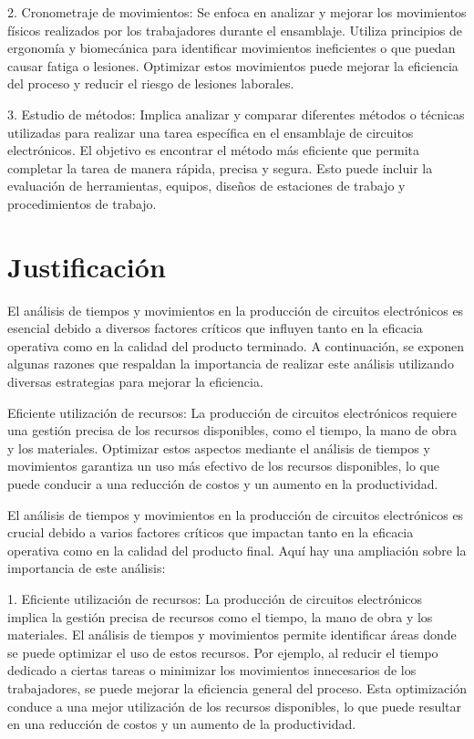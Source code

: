     2. Cronometraje de movimientos: Se enfoca en analizar y mejorar los movimientos físicos realizados por los trabajadores durante el ensamblaje. Utiliza principios de ergonomía y biomecánica para identificar movimientos ineficientes o que puedan causar fatiga o lesiones. Optimizar estos movimientos puede mejorar la eficiencia del proceso y reducir el riesgo de lesiones laborales.
    \newline
    
    3. Estudio de métodos: Implica analizar y comparar diferentes métodos o técnicas utilizadas para realizar una tarea específica en el ensamblaje de circuitos electrónicos. El objetivo es encontrar el método más eficiente que permita completar la tarea de manera rápida, precisa y segura. Esto puede incluir la evaluación de herramientas, equipos, diseños de estaciones de trabajo y procedimientos de trabajo.
    
    \section{Justificación }
    El análisis de tiempos y movimientos en la producción de circuitos electrónicos es esencial debido a diversos factores críticos que influyen tanto en la eficacia operativa como en la calidad del producto terminado. A continuación, se exponen algunas razones que respaldan la importancia de realizar este análisis utilizando diversas estrategias para mejorar la eficiencia.
    \newline
    
    Eficiente utilización de recursos: La producción de circuitos electrónicos requiere una gestión precisa de los recursos disponibles, como el tiempo, la mano de obra y los materiales. Optimizar estos aspectos mediante el análisis de tiempos y movimientos garantiza un uso más efectivo de los recursos disponibles, lo que puede conducir a una reducción de costos y un aumento en la productividad.\newline
    
    El análisis de tiempos y movimientos en la producción de circuitos electrónicos es crucial debido a varios factores críticos que impactan tanto en la eficacia operativa como en la calidad del producto final. Aquí hay una ampliación sobre la importancia de este análisis: \newline
    
    1. Eficiente utilización de recursos: La producción de circuitos electrónicos implica la gestión precisa de recursos como el tiempo, la mano de obra y los materiales. El análisis de tiempos y movimientos permite identificar áreas donde se puede optimizar el uso de estos recursos. Por ejemplo, al reducir el tiempo dedicado a ciertas tareas o minimizar los movimientos innecesarios de los trabajadores, se puede mejorar la eficiencia general del proceso. Esta optimización conduce a una mejor utilización de los recursos disponibles, lo que puede resultar en una reducción de costos y un aumento de la productividad. \newline
    
